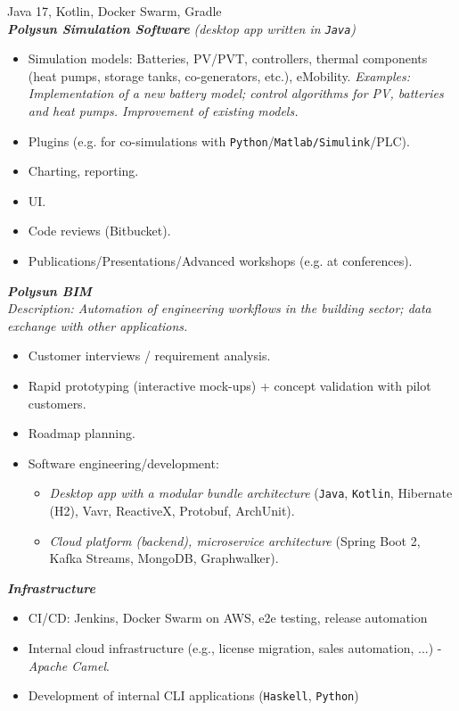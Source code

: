 \documentclass[11pt,a4paper,ngerman,sans]{moderncv}
\begin{document}
{
  Java 17, Kotlin, Docker Swarm, Gradle\newline
  \\
	\textbf{\emph{Polysun Simulation Software}} \emph{(desktop app written in \texttt{Java})}
  \begin{itemize}
    \item Simulation models: Batteries, PV/PVT, controllers, thermal components 
      (heat pumps, storage tanks, co-generators, etc.), eMobility.
      \emph{Examples: Implementation of a new battery model; control algorithms for PV, batteries and heat pumps. Improvement of existing models.}
    \item Plugins (e.g. for co-simulations with \texttt{Python}/\texttt{Matlab/Simulink}/PLC).
    \item Charting, reporting.
    \item UI. 
    \item Code reviews (Bitbucket).
    \item Publications/Presentations/Advanced workshops (e.g. at conferences).
      \\
  \end{itemize}
	\textbf{\emph{Polysun BIM}} 
  \\
	\emph{Description: Automation of engineering workflows in the building sector; 
	data exchange with other applications.}
  \begin{itemize}
    \item Customer interviews / requirement analysis.
    \item Rapid prototyping (interactive mock-ups) + concept validation with pilot customers.
    \item Roadmap planning.
    \item Software engineering/development:
      \begin{itemize}
        \item \emph{Desktop app with a modular bundle architecture} 
          (\texttt{Java}, \texttt{Kotlin}, Hibernate (H2), Vavr, ReactiveX, Protobuf, ArchUnit).
        \item \emph{Cloud platform (backend), microservice architecture} (Spring Boot 2, Kafka Streams, MongoDB, Graphwalker).
          \\
      \end{itemize}
  \end{itemize}
  \textbf{\emph{Infrastructure}}
  \begin{itemize}
    \item CI/CD: Jenkins, Docker Swarm on AWS, e2e testing, release automation
    \item Internal cloud infrastructure (e.g., license migration, sales automation, ...) - \emph{Apache Camel}.	
    \item Development of internal CLI applications (\texttt{Haskell}, \texttt{Python})
      \\
  \end{itemize}
}
{}
\end{document}

